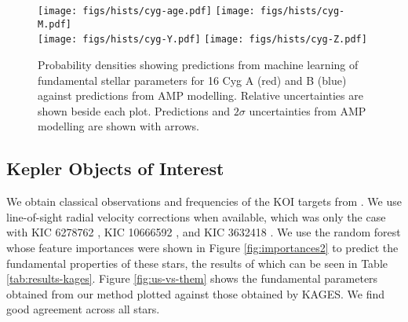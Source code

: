 \documentclass[manuscript]{aastex}
\begin{document}
\begin{figure*}
    \centering
    \texttt{[image: figs/hists/cyg-age.pdf]}\hfill
    \texttt{[image: figs/hists/cyg-M.pdf]}\\
    \texttt{[image: figs/hists/cyg-Y.pdf]}\hfill
    \texttt{[image: figs/hists/cyg-Z.pdf]}
    \caption{Probability densities showing predictions from machine learning of fundamental stellar parameters for 16 Cyg A (red) and B (blue) against predictions from AMP modelling. Relative uncertainties are shown beside each plot. Predictions and $2\sigma$ uncertainties from AMP modelling are shown with arrows.}
    \label{fig:16Cyg-hist}
\end{figure*}


\subsection{Kepler Objects of Interest}
We obtain classical observations and frequencies of the KOI targets from \citet[hereafter KAGES]{2015MNRAS.452.2127S}. We use line-of-sight radial velocity corrections when available, which was only the case with KIC 6278762 \citep{2002AJ....124.1144L}, KIC 10666592 \citep{2013A&A...554A..84M}, and KIC 3632418 \citep{2006AstL...32..759G}. We use the random forest whose feature importances were shown in Figure \ref{fig:importances2} to predict the fundamental properties of these stars, the results of which can be seen in Table \ref{tab:results-kages}. Figure \ref{fig:us-vs-them} shows the fundamental parameters obtained from our method plotted against those obtained by KAGES. We find good agreement across all stars. 
\end{document}
